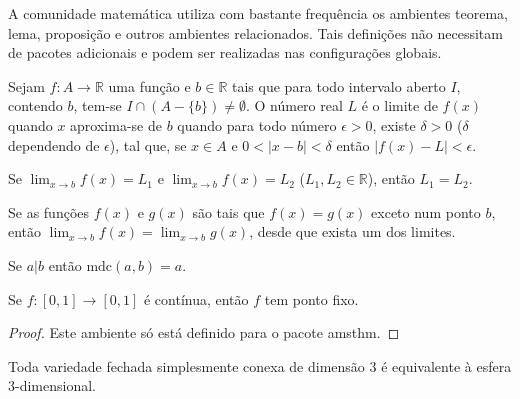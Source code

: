 A comunidade matemática utiliza com bastante frequência os ambientes 
\textsf{teorema}, \textsf{lema}, \textsf{proposição} e outros ambientes 
relacionados. Tais definições não necessitam de pacotes adicionais e
podem ser realizadas nas configurações globais.

\begin{definition}[Limite]
  \label{definicao}
  Sejam $f\colon A\rightarrow\mathds{R}$ uma função e $b\in\mathds{R}$ tais 
  que para todo intervalo aberto $I$, contendo $b$, tem-se 
  $I\cap(A-\{b\})\neq\emptyset$. O número real $L$ é o limite de $f(x)$ quando
  $x$ aproxima-se de $b$ quando para todo número $\epsilon>0$, existe $\delta>0$
  ($\delta$ dependendo de $\epsilon$), tal que, se $x\in A$ e $0<|x-b|<\delta$
  então $|f(x)-L|<\epsilon$.
\end{definition}

\begin{proposition}
  \label{proposicao}
  Se $\lim_{x\rightarrow b}f(x)=L_1$ e $\lim_{x\rightarrow b}f(x)=L_2$
  ($L_1,L_2\in\mathds{R}$), então $L_1=L_2$.
\end{proposition}

\begin{corollary}
  \label{corolario}
  Se as funções $f(x)$ e $g(x)$ são tais que $f(x) = g(x)$ exceto num ponto $b$,
  então $\lim_{x\rightarrow b}f(x)=\lim_{x\rightarrow b}g(x)$, desde que exista
  um dos limites.
\end{corollary}

\begin{lemma}
  \label{lema}
  Se $a|b$ então $\mathrm{mdc}(a,b)=a$.
\end{lemma}

\begin{theorem}
  \label{teorema}
  Se $f\colon[0,1]\rightarrow[0,1]$ é contínua, então $f$ tem ponto fixo.
\end{theorem}
\begin{proof}
  Este ambiente só está definido para o pacote \textsf{amsthm}.
\end{proof}


\begin{conjecture}[de Poincaré]
  \label{conjectura}
  Toda variedade fechada simplesmente conexa de dimensão 3 é equivalente à esfera
  3-dimensional.
\end{conjecture}


